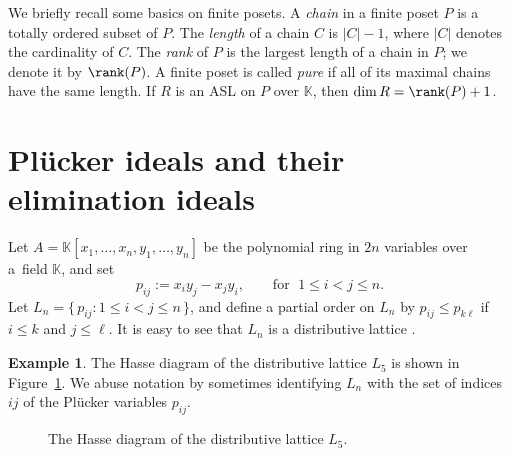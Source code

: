 \documentclass[12pt,a4paper]{amsart}
\theoremstyle{definition}
\newtheorem{Example}[Theorem]{Example}
\begin{document}
\smallskip

We briefly recall some basics on finite posets. A \emph{chain} in a finite poset $P$ is a totally ordered subset of $P$. The \emph{length} of a chain $C$ is $|C|-1$, where $|C|$ denotes the cardinality of $C$. The \emph{rank} of $P$ is the largest length of a chain in $P$; we denote it by $\rank(P)$. A finite poset is called \emph{pure} if all of its maximal chains have the same length. If $R$ is an ASL on $P$ over $\mathbb{K}$, then $\dim R=\rank(P)+1$.  



\section{Pl\"ucker ideals and their elimination ideals}\label{sec: 2}
Let $A=\mathbb{K}[x_1,\ldots,x_n,y_1,\ldots,y_n]$ be the polynomial ring in $2n$ variables over a~field $\mathbb{K}$, and set
\[
p_{ij}:=x_i y_j - x_j y_i,\qquad \text{for } \; 1\le i<j\le n.
\]
Let $L_n =\{\,p_{ij} : 1\le i<j\le n\,\}$, and define a partial order on $L_n$ by $p_{ij}\le p_{k\ell}$ if $i\le k$ and $j\le \ell$. It is easy to see that $L_n$ is a distributive lattice \cite{Hibi87}. 
\begin{Example}
The Hasse diagram of the distributive lattice \(L_5\) is shown in Figure~\ref{fig: dist lattice L5}. We abuse notation by sometimes identifying \(L_n\) with the set of indices \(ij\) of the Plücker variables $p_{ij}$.
\begin{figure}
    \centering
{}
    \caption{The Hasse diagram of the distributive lattice $L_5$. }
    \label{fig: dist lattice L5}
\end{figure}    
\end{Example}
\end{document}
